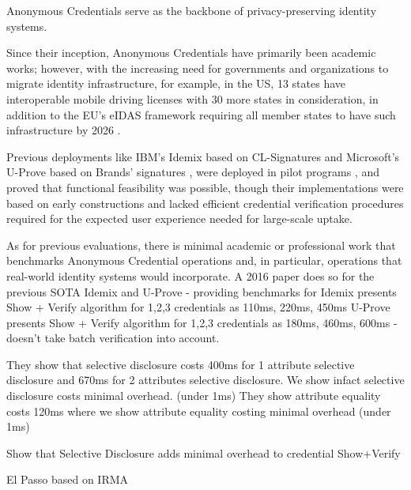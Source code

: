 Anonymous Credentials serve as the backbone of privacy-preserving identity systems. 

Since their inception, Anonymous Credentials have primarily been academic works; however, with the increasing need for governments and organizations to migrate identity infrastructure, for example, in the US, 13 states have interoperable mobile driving licenses \cite{aamva_jurisdiction_nodate} with 30 more states in consideration, in addition to the EU's eIDAS framework requiring all member states to have such infrastructure by 2026 \cite{european_parliament_meps_2024}. 

Previous deployments like IBM's Idemix \cite{camenisch_design_2002} based on CL-Signatures \cite{camenisch_design_2002, cimato_signature_2003} and Microsoft's U-Prove \cite{dunkelman_formal_2016} based on Brands' signatures \cite{brands_rethinking_2000}, were deployed in pilot programs \cite{dunkelman_formal_2016}, and proved that functional feasibility was possible, though their implementations were based on early constructions and lacked efficient credential verification procedures required for the expected user experience needed for large-scale uptake.

As for previous evaluations, there is minimal academic or professional work that benchmarks Anonymous Credential operations and, in particular, operations that real-world identity systems would incorporate. 
A 2016 paper \cite{habib_evaluation_2016} does so for the previous SOTA Idemix and U-Prove - providing benchmarks for 
Idemix presents Show + Verify algorithm for 1,2,3 credentials as 110ms, 220ms, 450ms
U-Prove presents Show + Verify algorithm for 1,2,3 credentials as 180ms, 460ms, 600ms
- doesn't take batch verification into account.


 \cite{habib_evaluation_2016}
They show that selective disclosure costs 400ms for 1 attribute selective disclosure and 670ms for 2 attributes selective disclosure. We show infact selective disclosure costs minimal overhead. (under 1ms)
They show attribute equality costs 120ms where we show attribute equality costing minimal overhead (under 1ms)

Show that Selective Disclosure adds minimal overhead to credential Show+Verify



El Passo \cite{zhang_passo_2021}
based on IRMA \cite{fischer-hubner_towards_2013}





